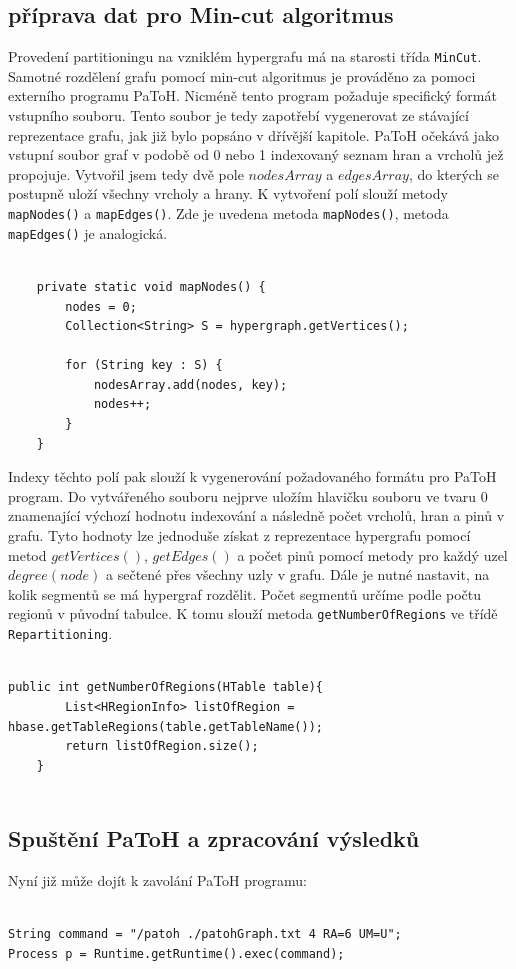 \documentclass[thesis=M,czech]{FITthesis}[2012/06/26]
\begin{document}
\subsection{příprava dat pro Min-cut algoritmus}
Provedení partitioningu na vzniklém hypergrafu má na starosti třída \texttt{MinCut}. Samotné rozdělení grafu pomocí min-cut algoritmus je prováděno za pomoci externího programu PaToH. Nicméně tento program požaduje specifický formát vstupního souboru. Tento soubor je tedy zapotřebí vygenerovat ze stávající reprezentace grafu, jak již bylo popsáno v dřívější kapitole. PaToH očekává jako vstupní soubor graf v podobě od 0 nebo 1 indexovaný seznam hran a vrcholů jež propojuje.  Vytvořil jsem tedy dvě pole $nodesArray$ a $edgesArray$, do kterých se postupně uloží všechny vrcholy a hrany. K vytvoření polí slouží metody \texttt{mapNodes()} a \texttt{mapEdges()}. Zde je uvedena metoda \texttt{mapNodes()}, metoda \texttt{mapEdges()} je analogická.

\begin{lstlisting}[frame=single]  % Start your code-block
    
    private static void mapNodes() {
        nodes = 0;
        Collection<String> S = hypergraph.getVertices();

        for (String key : S) {
            nodesArray.add(nodes, key);
            nodes++;
        }
    }
\end{lstlisting}

Indexy těchto polí pak slouží k vygenerování požadovaného formátu pro PaToH program. Do vytvářeného souboru nejprve uložím hlavičku souboru ve tvaru 0 znamenající výchozí hodnotu indexování a následně počet vrcholů, hran a pinů v grafu. Tyto hodnoty lze jednoduše získat z reprezentace hypergrafu pomocí metod $getVertices()$, $getEdges()$ a počet pinů pomocí metody pro každý uzel $degree(node)$ a sečtené přes všechny uzly v grafu.
Dále je nutné nastavit, na kolik segmentů se má hypergraf rozdělit. Počet segmentů určíme podle počtu regionů v původní tabulce. K tomu slouží metoda \texttt{getNumberOfRegions} ve třídě \texttt{Repartitioning}.
\begin{lstlisting}[frame=single]  % Start your code-block

public int getNumberOfRegions(HTable table){
        List<HRegionInfo> listOfRegion = hbase.getTableRegions(table.getTableName());
        return listOfRegion.size();
    }


\end{lstlisting}
\subsection{Spuštění PaToH a zpracování výsledků}
Nyní již může dojít k zavolání PaToH programu:
\begin{lstlisting}[frame=single]  % Start your code-block

String command = "/patoh ./patohGraph.txt 4 RA=6 UM=U";
Process p = Runtime.getRuntime().exec(command);
\end{lstlisting}
\end{document}
